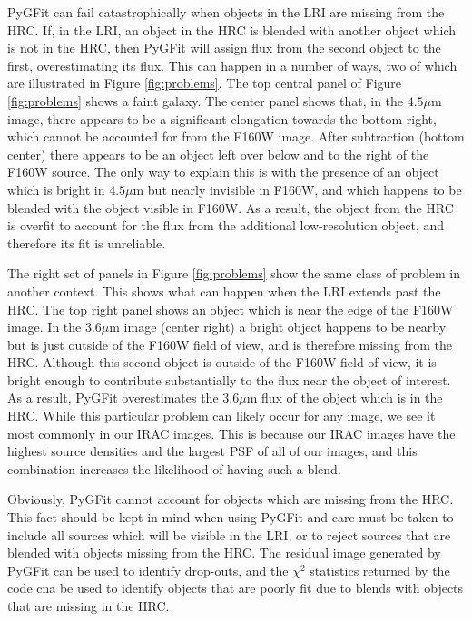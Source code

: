 \documentclass[preprint]{aastex}
\newcommand{\pygfit}{PyGFit}
\begin{document}
\pygfit{} can fail catastrophically when objects in the LRI are missing from the HRC.  If, in the LRI, an object in the HRC is blended with another object which is not in the HRC, then \pygfit{} will assign flux from the second object to the first, overestimating its flux.  This can happen in a number of ways, two of which are illustrated in Figure \ref{fig:problems}.  The top central panel of Figure \ref{fig:problems} shows a faint galaxy.  The center panel shows that, in the $4.5\mu$m image, there appears to be a significant elongation towards the bottom right, which cannot be accounted for from the F160W image.  After subtraction (bottom center) there appears to be an object left over below and to the right of the F160W source.  The only way to explain this is with the presence of an object which is bright in $4.5\mu$m but nearly invisible in F160W, and which happens to be blended with the object visible in F160W.  As a result, the object from the HRC is overfit to account for the flux from the additional low-resolution object, and therefore its fit is unreliable.

The right set of panels in Figure \ref{fig:problems} show the same class of problem in another context.  This shows what can happen when the LRI extends past the HRC.  The top right panel shows an object which is near the edge of the F160W image.  In the $3.6\mu$m image (center right) a bright object happens to be nearby but is just outside of the F160W field of view, and is therefore missing from the HRC.  Although this second object is outside of the F160W field of view, it is bright enough to contribute substantially to the flux near the object of interest.  As a result, \pygfit{} overestimates the $3.6\mu$m flux of the object which is in the HRC.  While this particular problem can likely occur for any image, we see it most commonly in our IRAC images.  This is because our IRAC images have the highest source densities and the largest PSF of all of our images, and this combination increases the likelihood of having such a blend.

Obviously, \pygfit{} cannot account for objects which are missing from the HRC.  This fact should be kept in mind when using \pygfit{} and care must be taken to include all sources which will be visible in the LRI, or to reject sources that are blended with objects missing from the HRC. The residual image generated by \pygfit{} can be used to identify drop-outs, and the $\chi^2$ statistics returned by the code cna be used to identify objects that are poorly fit due to blends with objects that are missing in the HRC.
\end{document}
